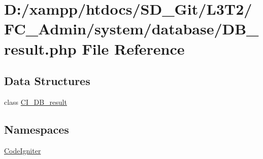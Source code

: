 \hypertarget{_d_b__result_8php}{}\section{D\+:/xampp/htdocs/\+S\+D\+\_\+\+Git/\+L3\+T2/\+F\+C\+\_\+\+Admin/system/database/\+D\+B\+\_\+result.php File Reference}
\label{_d_b__result_8php}
\subsection*{Data Structures}
\begin{DoxyCompactItemize}
\item 
class \hyperlink{class_c_i___d_b__result}{C\+I\+\_\+\+D\+B\+\_\+result}
\end{DoxyCompactItemize}
\subsection*{Namespaces}
\begin{DoxyCompactItemize}
\item 
 \hyperlink{namespace_code_igniter}{Code\+Igniter}
\end{DoxyCompactItemize}
